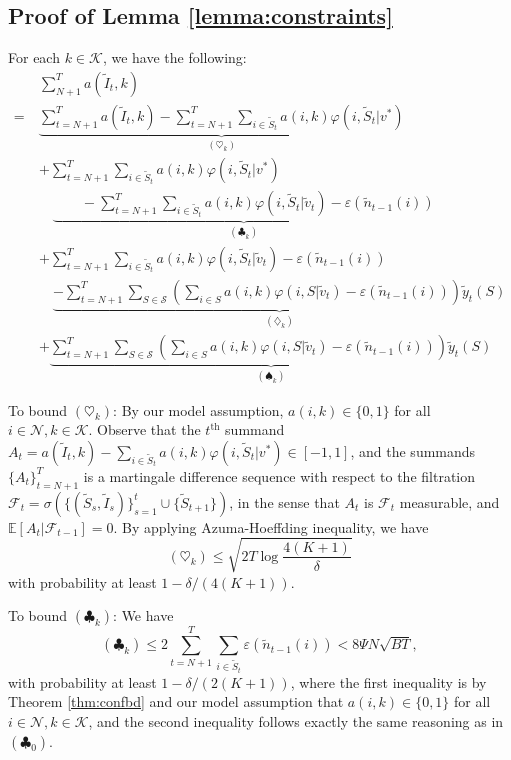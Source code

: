 \documentclass{article}
\theoremstyle{definition}
\newcommand{\EEE}{\mathbb{E}}
\newcommand{\FFF}{\mathcal{F}}
\newcommand{\KKK}{\mathcal{K}}
\newcommand{\NNN}{\mathcal{N}}
\newcommand{\SSS}{\mathcal{S}}
\begin{document}
\subsection{Proof of Lemma \ref{lemma:constraints}}\label{app:pflemmaconstraints}

For each $k\in \KKK$, we have the following:
\begin{align}
& \sum^{T}_{N+1}a(\tilde{I}_t, k) \nonumber\\
=& \underbrace{\sum^T_{t=N+1}a(\tilde{I}_t, k) - \sum^{T}_{t = N+1}\sum_{i\in \tilde{S}_t} a(i, k) \varphi(i, \tilde{S}_t|v^*)}_{(\heartsuit_k)} \nonumber\\
& +\sum^{T}_{t = N+1}\sum_{i\in \tilde{S}_t} a(i, k) \varphi(i, \tilde{S}_t|v^*) \nonumber\\
& \quad \underbrace{\qquad - \sum^{T}_{t = N+1}\sum_{i\in \tilde{S}_t} a(i,k) \varphi(i, \tilde{S}_t|\tilde{v}_t) - \varepsilon(\tilde{n}_{t-1}(i))  }_{(\clubsuit_k)} \nonumber\\
\quad &  + \sum^{T}_{t = N+1}\sum_{i\in \tilde{S}_t} a(i,k) \varphi(i, \tilde{S}_t|\tilde{v}_t) - \varepsilon(\tilde{n}_{t-1}(i)) \nonumber\\
\quad & \quad \underbrace{ - \sum^{T}_{t = N+1}\sum_{S\in\SSS}\left(\sum_{i\in S} a(i,k) \varphi(i, S|\tilde{v}_t) - \varepsilon(\tilde{n}_{t-1}(i))\right)\tilde{y}_t(S)}_{(\diamondsuit_k)} \nonumber\\
& + \underbrace{\sum^{T}_{t = N+1}\sum_{S\in\SSS}\left(\sum_{i\in S} a(i,k) \varphi(i, S|\tilde{v}_t) - \varepsilon(\tilde{n}_{t-1}(i))\right)\tilde{y}_t(S)}_{(\spadesuit_k)} \nonumber 
\end{align}

To bound $(\heartsuit_k)$: By our model assumption, $a(i, k)\in \{0, 1\}$ for all $i\in \NNN, k\in \KKK$. Observe that the $t^\text{th}$ summand $A_t = a(\tilde{I}_t, k) - \sum_{i\in \tilde{S}_t} a(i, k) \varphi(i, \tilde{S}_t|v^*)\in[-1, 1]$, and the summands $\{A_t\}^T_{t=N+1}$ is a martingale difference sequence with respect to the filtration $\FFF_t = \sigma(\{(\tilde{S}_s, \tilde{I}_s)\}^t_{s = 1}\cup \{\tilde{S}_{t+1}\})$, in the sense that $A_t$ is $\FFF_t$ measurable, and $\EEE[A_t | \FFF_{t-1}] = 0$. By applying Azuma-Hoeffding inequality, we have
\begin{equation}
(\heartsuit_k) \leq \sqrt{2T\log{\frac{4(K+1)}{\delta}}}
\end{equation}
with probability at least $1 - \delta/(4(K+1))$.

To bound $(\clubsuit_k)$: We have
\begin{equation*}
(\clubsuit_k) \leq 2\sum^T_{t = N+1}\sum_{i\in \tilde{S}_t}\varepsilon(\tilde{n}_{t - 1}(i))< 8\Psi N \sqrt{BT},%
\end{equation*}
with probability at least $1- \delta/(2(K+1))$, where the first inequality is by Theorem \ref{thm:confbd} and our model assumption that $a(i, k)\in \{0,1\}$ for all $i\in \NNN, k\in \KKK$, and the second inequality follows exactly the same reasoning as in $(\clubsuit_0)$.
\end{document}
